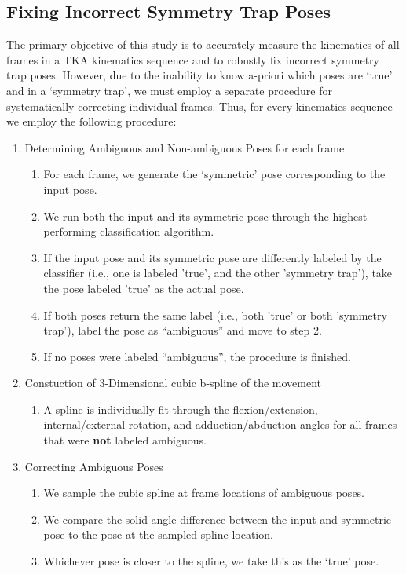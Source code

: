 \subsection{Fixing Incorrect Symmetry Trap Poses}
The primary objective of this study is to accurately measure the kinematics of all frames in a TKA kinematics sequence and to robustly fix incorrect symmetry trap poses.
However, due to the inability to know a-priori which poses are `true' and in a `symmetry trap', we must employ a separate procedure for systematically correcting individual frames.
Thus, for every kinematics sequence we employ the following procedure:

\begin{enumerate}
  \item Determining Ambiguous and Non-ambiguous Poses for each frame
        \begin{enumerate}
          \item For each frame, we generate the `symmetric' pose corresponding to the input pose.
          \item We run both the input and its symmetric pose through the highest performing classification algorithm.
          \item If the input pose and its symmetric pose are differently labeled by the classifier (i.e., one is labeled 'true', and the other 'symmetry trap'), take the pose labeled 'true' as the actual pose.
          \item If both poses return the same label (i.e., both 'true' or both 'symmetry trap'), label the pose as “ambiguous” and move to step 2.
          \item If no poses were labeled “ambiguous”, the procedure is finished.
        \end{enumerate}
  \item Constuction of 3-Dimensional cubic b-spline of the movement
        \begin{enumerate}
          \item A spline is individually fit through the flexion/extension, internal/external rotation, and adduction/abduction angles for all frames that were {\bf not} labeled ambiguous.
        \end{enumerate}
  \item Correcting Ambiguous Poses
        \begin{enumerate}
          \item We sample the cubic spline at frame locations of ambiguous poses.
          \item We compare the solid-angle difference between the input and symmetric pose to the pose at the sampled spline location.
          \item Whichever pose is closer to the spline, we take this as the `true' pose.
        \end{enumerate}
\end{enumerate}

